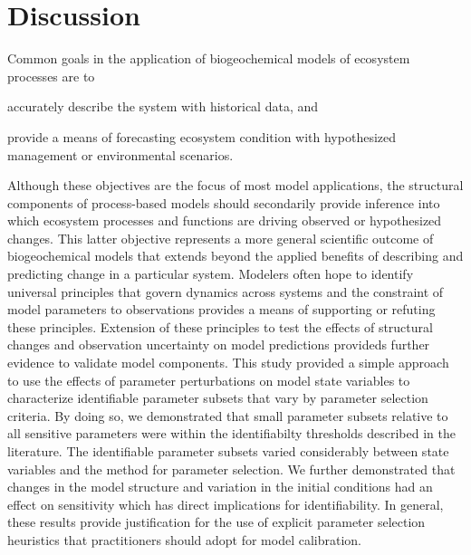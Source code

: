 \documentclass[letterpaper,12pt,oneside]{article}\usepackage[]{graphicx}\usepackage[]{color}
\begin{document}
\section{Discussion}

Common goals in the application of biogeochemical models of ecosystem processes are to \begin{inparaenum}[1\upshape)]
\item accurately describe the system with historical data, and 
\item provide a means of forecasting ecosystem condition with hypothesized management or environmental scenarios. 
\end{inparaenum}
Although these objectives are the focus of most model applications, the structural components of process-based models should secondarily provide inference into which ecosystem processes and functions are driving observed or hypothesized changes.  This latter objective represents a more general scientific outcome of biogeochemical models that extends beyond the applied benefits of describing and predicting change in a particular system.  Modelers often hope to identify universal principles that govern dynamics across systems and the constraint of model parameters to observations provides a means of supporting or refuting these principles.  Extension of these principles to test the effects of structural changes and observation uncertainty on model predictions provideds further evidence to validate model components. This study provided a simple approach to use the effects of parameter perturbations on model state variables to characterize identifiable parameter subsets that vary by parameter selection criteria.  By doing so, we demonstrated that small parameter subsets relative to all sensitive parameters were within the identifiabilty thresholds described in the literature.  The identifiable parameter subsets varied considerably between state variables and the method for parameter selection.  We further demonstrated that changes in the model structure and variation in the initial conditions had an effect on sensitivity which has direct implications for identifiability. In general, these results provide justification for the use of explicit parameter selection heuristics that practitioners should adopt for model calibration.
\end{document}
